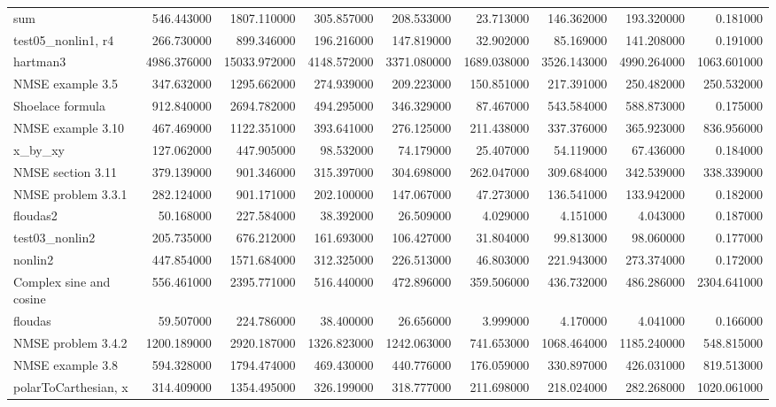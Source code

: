 \begin{longtable}{lrrrrrrrr}
sum & 546.443000 & 1807.110000 & 305.857000 & 208.533000 & 23.713000 & 146.362000 & 193.320000 & 0.181000 \\
test05\_nonlin1, r4 & 266.730000 & 899.346000 & 196.216000 & 147.819000 & 32.902000 & 85.169000 & 141.208000 & 0.191000 \\
hartman3 & 4986.376000 & 15033.972000 & 4148.572000 & 3371.080000 & 1689.038000 & 3526.143000 & 4990.264000 & 1063.601000 \\
NMSE example 3.5 & 347.632000 & 1295.662000 & 274.939000 & 209.223000 & 150.851000 & 217.391000 & 250.482000 & 250.532000 \\
Shoelace formula & 912.840000 & 2694.782000 & 494.295000 & 346.329000 & 87.467000 & 543.584000 & 588.873000 & 0.175000 \\
NMSE example 3.10 & 467.469000 & 1122.351000 & 393.641000 & 276.125000 & 211.438000 & 337.376000 & 365.923000 & 836.956000 \\
x\_by\_xy & 127.062000 & 447.905000 & 98.532000 & 74.179000 & 25.407000 & 54.119000 & 67.436000 & 0.184000 \\
NMSE section 3.11 & 379.139000 & 901.346000 & 315.397000 & 304.698000 & 262.047000 & 309.684000 & 342.539000 & 338.339000 \\
NMSE problem 3.3.1 & 282.124000 & 901.171000 & 202.100000 & 147.067000 & 47.273000 & 136.541000 & 133.942000 & 0.182000 \\
floudas2 & 50.168000 & 227.584000 & 38.392000 & 26.509000 & 4.029000 & 4.151000 & 4.043000 & 0.187000 \\
test03\_nonlin2 & 205.735000 & 676.212000 & 161.693000 & 106.427000 & 31.804000 & 99.813000 & 98.060000 & 0.177000 \\
nonlin2 & 447.854000 & 1571.684000 & 312.325000 & 226.513000 & 46.803000 & 221.943000 & 273.374000 & 0.172000 \\
Complex sine and cosine & 556.461000 & 2395.771000 & 516.440000 & 472.896000 & 359.506000 & 436.732000 & 486.286000 & 2304.641000 \\
floudas & 59.507000 & 224.786000 & 38.400000 & 26.656000 & 3.999000 & 4.170000 & 4.041000 & 0.166000 \\
NMSE problem 3.4.2 & 1200.189000 & 2920.187000 & 1326.823000 & 1242.063000 & 741.653000 & 1068.464000 & 1185.240000 & 548.815000 \\
NMSE example 3.8 & 594.328000 & 1794.474000 & 469.430000 & 440.776000 & 176.059000 & 330.897000 & 426.031000 & 819.513000 \\
polarToCarthesian, x & 314.409000 & 1354.495000 & 326.199000 & 318.777000 & 211.698000 & 218.024000 & 282.268000 & 1020.061000 \\

\end{longtable}
